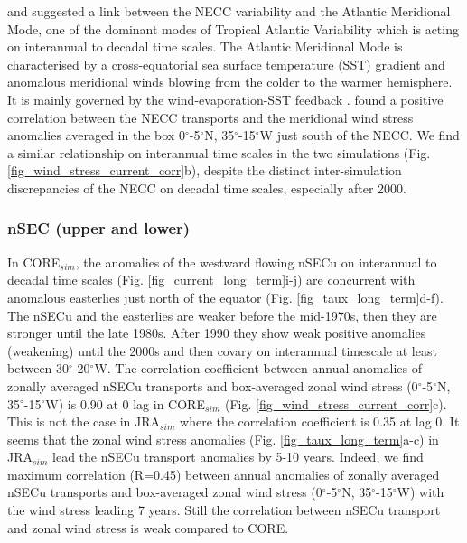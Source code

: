 \documentclass[os, manuscript]{copernicus}
\begin{document}
	\cite{Goes2013} and \cite{Hormann2012} suggested a link between the NECC variability and the Atlantic Meridional Mode, one of the dominant modes of Tropical Atlantic Variability which is acting on interannual to decadal time scales. The Atlantic Meridional Mode is characterised by a cross-equatorial sea surface temperature (SST) gradient and anomalous meridional winds blowing from the colder to the warmer hemisphere. It is mainly governed by the wind-evaporation-SST feedback \citep{Carton1996a,Chang1997}. \cite{Goes2013} found a positive correlation between the NECC transports and the meridional wind stress anomalies averaged in the box 0$^{\circ}$-5$^{\circ}$N, 35$^{\circ}$-15$^{\circ}$W just south of the NECC. We find a similar relationship on interannual time scales in the two simulations (Fig. \ref{fig_wind_stress_current_corr}b), despite the distinct inter-simulation discrepancies of the NECC on decadal time scales, especially after 2000.
	
	\subsubsection{nSEC (upper and lower)}
	In CORE$_{sim}$, the anomalies of the westward flowing nSECu on interannual to decadal time scales (Fig. \ref{fig_current_long_term}i-j) are concurrent with anomalous easterlies just north of the equator (Fig. \ref{fig_taux_long_term}d-f). The nSECu and the easterlies are weaker before the mid-1970s, then they are stronger until the late 1980s. After 1990 they show weak positive anomalies (weakening) until the 2000s and then covary on interannual timescale at least between 30$^{\circ}$-20$^{\circ}$W. The correlation coefficient between annual anomalies of zonally averaged nSECu transports and box-averaged zonal wind stress (0$^{\circ}$-5$^{\circ}$N, 35$^{\circ}$-15$^{\circ}$W) is 0.90 at 0 lag in CORE$_{sim}$  (Fig. \ref{fig_wind_stress_current_corr}c). This is not the case in JRA$_{sim}$ where the correlation coefficient is 0.35 at lag 0. It seems that the zonal wind stress anomalies (Fig. \ref{fig_taux_long_term}a-c) in JRA$_{sim}$ lead the nSECu transport anomalies by 5-10 years. Indeed, we find maximum correlation (R=0.45) between annual anomalies of zonally averaged nSECu transports and box-averaged zonal wind stress (0$^{\circ}$-5$^{\circ}$N, 35$^{\circ}$-15$^{\circ}$W) with the wind stress leading 7 years. Still the correlation between nSECu transport and zonal wind stress is weak compared to CORE.
	
\end{document}
